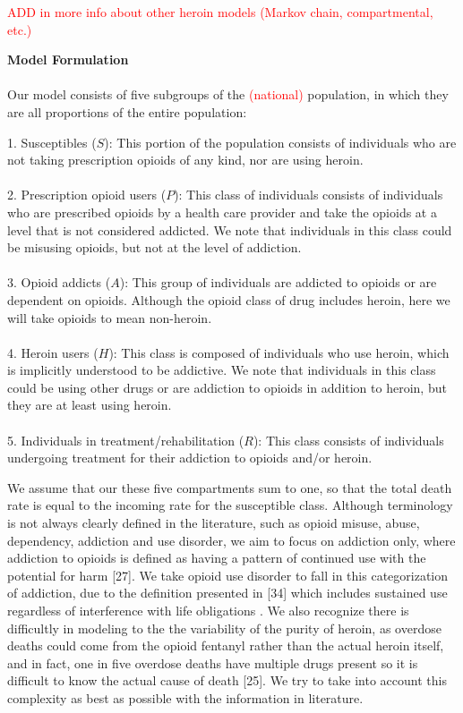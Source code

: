\documentclass[12pt]{article}
\begin{document}
\textcolor{red}{ADD in more info about other heroin models (Markov chain, compartmental, etc.)}

\textbf{Model Formulation} \\ \\
Our model consists of five subgroups of the \textcolor{red}{(national)} population, in which they are all proportions of the entire population: 

1. Susceptibles ($S$): This portion of the population consists of individuals who are not taking prescription opioids of any kind, nor are using heroin. \\ \\
2. Prescription opioid users ($P$): This class of individuals consists of individuals who are prescribed opioids by a health care provider and take the opioids at a level that is not considered addicted. We note that individuals in this class could be misusing opioids, but not at the level of addiction.  \\ \\
3. Opioid addicts ($A$): This group of individuals are addicted to opioids or are dependent on opioids. Although the opioid class of drug includes heroin, here we will take opioids to mean non-heroin. \\ \\
4. Heroin users ($H$): This class is composed of individuals who use heroin, which is implicitly understood to be addictive. We note that individuals in this class could be using other drugs or are addiction to opioids in addition to heroin, but they are at least using heroin. \\ \\
5. Individuals in treatment/rehabilitation ($R$): This class consists of individuals undergoing treatment for their addiction to opioids and/or heroin. 

We assume that our these five compartments sum to one, so that the total death rate is equal to the incoming rate for the susceptible class. Although terminology is not always clearly defined in the literature, such as opioid misuse, abuse, dependency, addiction and use disorder, we aim to focus on addiction only, where addiction to opioids is defined as having a pattern of continued use with the potential for harm [27]. We take opioid use disorder to fall in this categorization of addiction, due to the definition presented in [34] which includes sustained use regardless of interference with life obligations . We also recognize there is difficultly in modeling to the the variability of the purity of heroin, as overdose deaths could come from the opioid fentanyl rather than the actual heroin itself, and in fact, one in five overdose deaths have multiple drugs present so it is difficult to know the actual cause of death [25]. We try to take into account this complexity as best as possible with the information in literature. 
\end{document}
